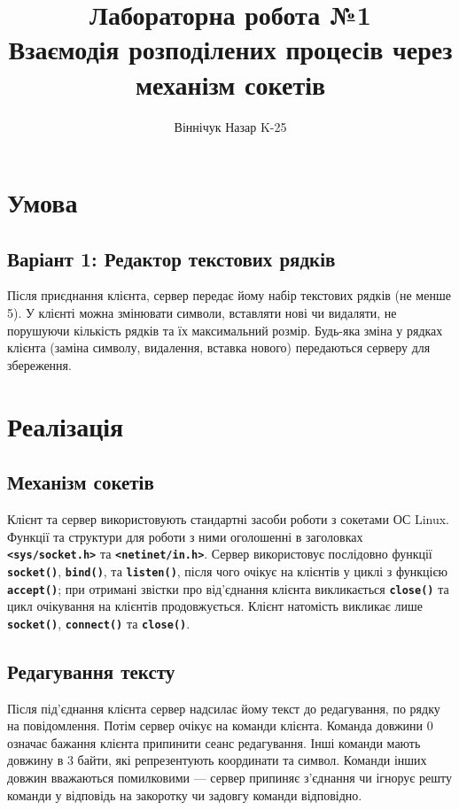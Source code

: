 \documentclass[a4paper]{article}
\title{
    Лабораторна робота №1\\
    Взаємодія розподілених процесів через механізм сокетів
}
\author{Віннічук Назар K-25}
\newcommand{\code}[1]{\textbf{\texttt{#1}}}
\begin{document}
\maketitle
\tableofcontents

\section{Умова}

\subsection{Варіант 1: Редактор текстових рядків}

Після приєднання клієнта, сервер передає йому набір текстових рядків (не менше
5). У клієнті можна змінювати символи, вставляти нові чи видаляти, не порушуючи
кількість рядків та їх максимальний розмір. Будь-яка зміна у рядках клієнта
(заміна символу, видалення, вставка нового) передаються серверу для збереження.

\section{Реалізація}

\subsection{Механізм сокетів}
Клієнт та сервер використовують стандартні засоби роботи з сокетами ОС Linux.
Функції та структури для роботи з ними оголошенні в заголовках
\code{<sys/socket.h>} та \code{<netinet/in.h>}. Сервер використовує послідовно
функції \code{socket()}, \code{bind()}, та \code{listen()}, після чого очікує
на клієнтів у циклі з функцією \code{accept()}; при отримані звістки про
від'єднання клієнта викликається \code{close()} та цикл очікування на клієнтів
продовжується. Клієнт натомість викликає лише \code{socket()}, \code{connect()}
та \code{close()}.

\subsection{Редагування тексту}
Після під'єднання клієнта сервер надсилає йому текст до редагування, по рядку
на повідомлення. Потім сервер очікує на команди клієнта. Команда довжини 0 означає
бажання клієнта припинити сеанс редагування. Інші команди мають довжину в 3 байти, які
репрезентують координати та символ. Команди інших довжин вважаються помилковими — сервер
припиняє з'єднання чи ігнорує решту команди у відповідь на закоротку чи задовгу команди
відповідно.
\end{document}
